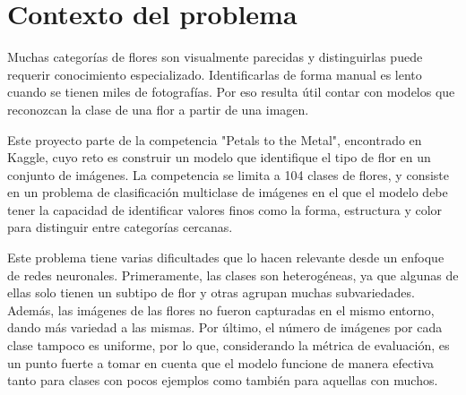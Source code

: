 \section{Contexto del problema}
Muchas categorías de flores son visualmente parecidas y distinguirlas puede requerir conocimiento especializado. Identificarlas de forma manual es lento cuando se tienen miles de fotografías. Por eso resulta útil contar con modelos que reconozcan la clase de una flor a partir de una imagen.

Este proyecto parte de la competencia "Petals to the Metal", encontrado en Kaggle, cuyo reto es construir un modelo que identifique el tipo de flor en un conjunto de imágenes. La competencia se limita a 104 clases de flores, y consiste en un problema de clasificación multiclase de imágenes en el que el modelo debe tener la capacidad de identificar valores finos como la forma, estructura y color para distinguir entre categorías cercanas. 

Este problema tiene varias dificultades que lo hacen relevante desde un enfoque de redes neuronales. Primeramente, las clases son heterogéneas, ya que algunas de ellas solo tienen un subtipo de flor y otras agrupan muchas subvariedades. Además, las imágenes de las flores no fueron capturadas en el mismo entorno, dando más variedad a las mismas. Por último, el número de imágenes por cada clase tampoco es uniforme, por lo que, considerando la métrica de evaluación, es un punto fuerte a tomar en cuenta que el modelo funcione de manera efectiva tanto para clases con pocos ejemplos como también para aquellas con muchos. 
